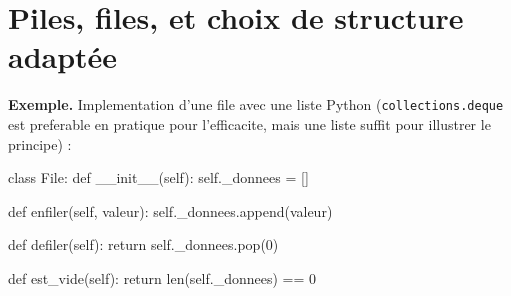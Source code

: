 
\section{Piles, files, et choix de structure adaptée}



\textbf{Exemple.} Implementation d'une file avec une liste Python (\lstinline{collections.deque} est preferable en pratique pour l'efficacite, mais une liste suffit pour illustrer le principe) :
\begin{python}
class File:
    def __init__(self):
        self._donnees = []

    def enfiler(self, valeur):
        self._donnees.append(valeur)

    def defiler(self):
        return self._donnees.pop(0)

    def est_vide(self):
        return len(self._donnees) == 0
\end{python}

%

